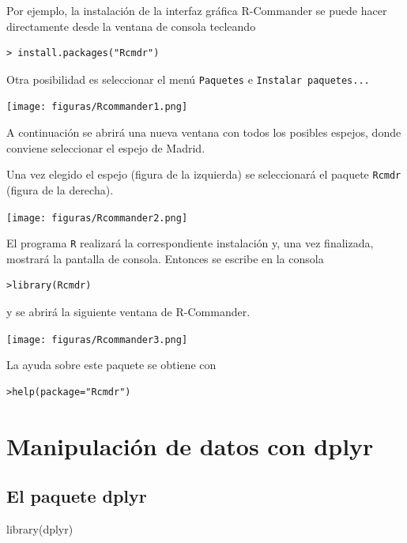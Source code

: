 \documentclass[
]{book}
\newenvironment{Shaded}{\begin{snugshade}}{\end{snugshade}}
\newcommand{\FunctionTok}[1]{\textcolor[rgb]{0.00,0.00,0.00}{#1}}
\newcommand{\NormalTok}[1]{#1}
\theoremstyle{break}
\begin{document}
Por ejemplo, la
instalación de la interfaz gráfica R-Commander se puede hacer
directamente desde la ventana de consola tecleando

\begin{verbatim}
> install.packages("Rcmdr")
\end{verbatim}

Otra posibilidad es seleccionar el menú \texttt{Paquetes} e
\texttt{Instalar\ paquetes...}

\texttt{[image: figuras/Rcommander1.png]}

A continuación se abrirá una nueva ventana con todos los posibles
espejos, donde conviene seleccionar el espejo de Madrid.

Una vez elegido el espejo (figura de la izquierda) se seleccionará el
paquete \texttt{Rcmdr} (figura de la derecha).

\texttt{[image: figuras/Rcommander2.png]}

El programa \texttt{R} realizará la correspondiente instalación y,
una vez finalizada, mostrará la pantalla de consola. Entonces se escribe
en la consola

\begin{verbatim}
>library(Rcmdr)
\end{verbatim}

y se abrirá la siguiente ventana de R-Commander.

\texttt{[image: figuras/Rcommander3.png]}

La ayuda sobre este paquete se obtiene con

\begin{verbatim}
>help(package="Rcmdr")
\end{verbatim}

\hypertarget{manipulaciuxf3n-de-datos-con-dplyr}{%
\chapter{Manipulación de datos con dplyr}\label{manipulaciuxf3n-de-datos-con-dplyr}}

\hypertarget{el-paquete-dplyr}{%
\section{\texorpdfstring{El paquete \textbf{dplyr}}{El paquete dplyr}}\label{el-paquete-dplyr}}

\begin{Shaded}
\begin{Highlighting}[]
\FunctionTok{library}\NormalTok{(dplyr)}
\end{Highlighting}
\end{Shaded}
\end{document}
